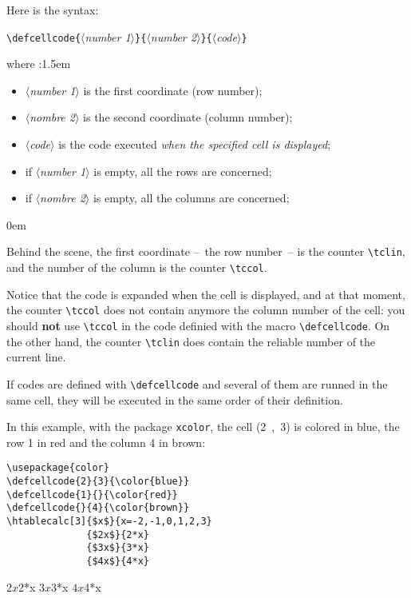 \documentclass[a4paper,10pt]{article}
\newcommand\argu[1]{$\langle$\textit{#1}$\rangle$}
\newcommand\ARGU[1]{\texttt{\{}\argu{#1}\texttt{\}}}
\newcommand\verbinline{\lstinline[breaklines=false,basicstyle=\normalsize\ttfamily]}
\newcommand\mywidth{0.85\linewidth}
\begin{document}
\begin{center}
	\def\tcprintvalue#1{}\def\tcprintresult#1#2{}
	\edefcellcode{}{}{(\number\tclin,\number\tccol)}
\end{center}
\medskip

Here is the syntax:

\verbinline|\defcellcode|\ARGU{number 1}\ARGU{number 2}\ARGU{code}
\smallskip

where :\parindent1.5em
\begin{itemize}
	\item \argu{number 1} is the first coordinate (row number);
	\item \argu{nombre 2} is the second coordinate (column number);
	\item \argu{code} is the code executed \emph{when the specified cell is displayed};
	\item if \argu{number 1} is empty, all the rows are concerned;
	\item if \argu{nombre 2} is empty, all the columns are concerned;
\end{itemize}\parindent0em
\smallskip

Behind the scene, the first coordinate --~the row number~-- is the counter \verbinline{\tclin}, and the number of the column is the counter \verbinline{\tccol}.\smallskip

Notice that the code is expanded when the cell is displayed, and at that moment, the counter \verbinline|\tccol| does not contain anymore the column number of the cell: you should \textbf{not} use \verbinline|\tccol| in the code definied with the macro \verbinline|\defcellcode|. On the other hand, the counter \verbinline|\tclin| does contain the reliable number of the current line.

If codes are defined with \verbinline|\defcellcode| and several of them are runned in the same cell, they will be executed in the same order of their definition.\medskip

In this example, with the package \verb|xcolor|, the cell (2~,~3) is colored in blue, the row 1 in red and the column 4 in brown:
\begin{center}
\begin{minipage}{\mywidth}
\begin{lstlisting}
\usepackage{color}
\defcellcode{2}{3}{\color{blue}}
\defcellcode{1}{}{\color{red}}
\defcellcode{}{4}{\color{brown}}
\htablecalc[3]{$x$}{x=-2,-1,0,1,2,3}
              {$2x$}{2*x}
              {$3x$}{3*x}
              {$4x$}{4*x}
\end{lstlisting}
\end{minipage}

              {$2x$}{2*x}
              {$3x$}{3*x}
              {$4x$}{4*x}
\end{center}
\end{document}
